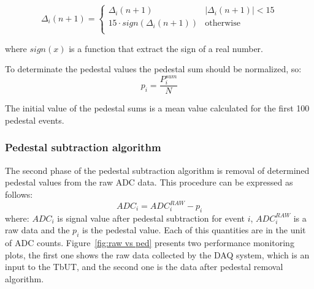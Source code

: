 \begin{equation} 
\Delta_{i}(n+1) =\left\{ \begin{array}{ll}
\Delta_{i}(n+1) & \left| \Delta_{i}(n+1) \right|<15 \\
 15 \cdot sign\left(\Delta_{i}(n+1)\right) & \textrm{otherwise}\\
\end{array} \right.
\end{equation}

where $sign(x)$ is a function that extract the sign of a real number. 

To determinate the pedestal values the pedestal sum should be normalized, so:
\begin{equation}
p_{i}=\frac{P^{sum}_{i}}{N}
\end{equation}

The initial value of the pedestal sums is a mean value calculated for the first 100 pedestal events. 

\subsubsection{Pedestal subtraction algorithm}
The second phase of the pedestal subtraction algorithm is removal of determined pedestal values from the raw ADC data. This procedure can be expressed as follows:
\begin{equation}
ADC_{i}=ADC^{RAW}_{i}-p_{i}
\end{equation} 
where: $ADC_{i}$ is signal value after pedestal subtraction for event $i$, $ADC^{RAW}_{i}$ is a raw data and the $p_{i}$ is the pedestal value. Each of this quantities are in the unit of ADC counts. 
Figure~\ref{fig:raw vs ped} presents two performance monitoring plots, the first one shows the raw data collected by the DAQ system, which is an input to the TbUT, and the second one is the data after pedestal removal algorithm.  

